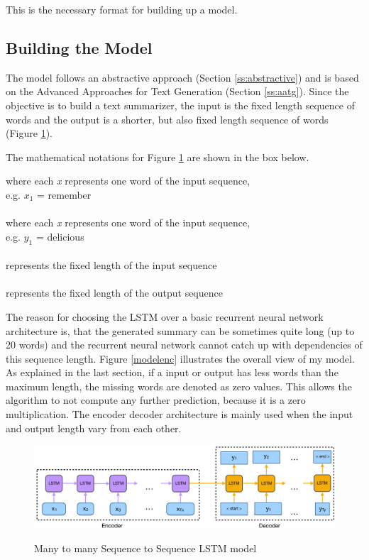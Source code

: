 This is the necessary format for building up a model.

\subsection{Building the Model}\label{ss:build}

The model follows an abstractive approach (Section \ref{ss:abstractive}) and is based on the Advanced Approaches for Text Generation (Section \ref{ss:aatg}). Since the objective is to build a text summarizer, the input is the fixed length sequence of words and the output is a shorter, but also fixed length sequence of words (Figure \ref{build_model}).
	
The mathematical notations for Figure \ref{build_model} are shown in the box below.
	
\begin{tcolorbox}
	\boldmath{\([x_{1}, x_{2}, x_{3}, ..., {x_{Tx}]}\)} where each \textit{x} represents one word of the input sequence, \\ e.g. \(x_{1}\) = remember \\ \\
	\boldmath{\([y_{1}, y_{2}, x_{3}, ..., {y_{Ty}]}\)} where each \textit{x} represents one word of the input sequence, \\ e.g. \(y_{1}\) = delicious \\ \\
	 represents the fixed length of the input sequence \\ \\
	 represents the fixed length of the output sequence
\end{tcolorbox}

The reason for choosing the LSTM over a basic recurrent neural network architecture is, that the generated summary can be sometimes quite long (up to 20 words) and the recurrent neural network cannot catch up with dependencies of this sequence length. Figure \ref{modelenc} illustrates the overall view of my model. 
As explained in the last section, if a input or output has less words than the maximum length, the missing words are denoted as zero values. This allows the algorithm to not compute any further prediction, because it is a zero multiplication. The encoder decoder architecture is mainly used when the input and output length vary from each other. 

\begin{figure}
	\begin{center}
		\includegraphics[width=6in]{photos/build-1}\\
		\caption{Many to many Sequence to Sequence LSTM model}\label{build_model}
	\end{center}
\end{figure}

